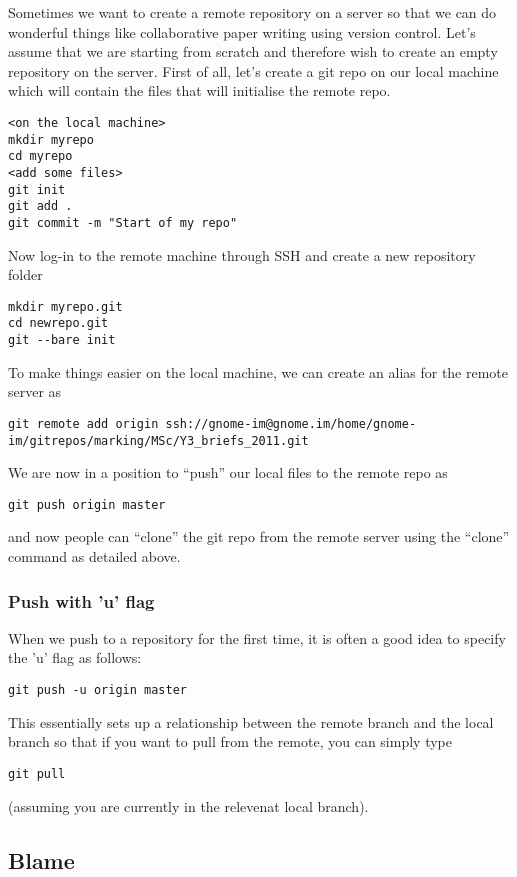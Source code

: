 \documentclass[a4paper, 10pt]{article}
\begin{document}
Sometimes we want to create a remote repository on a server so that we
can do wonderful things like collaborative paper writing using version
control. Let's assume that we are starting from scratch and therefore
wish to create an empty repository on the server. First of all, let's
create a git repo on our local machine which will contain the files
that will initialise the remote repo.
\begin{verbatim}
<on the local machine>
mkdir myrepo
cd myrepo
<add some files>
git init
git add .
git commit -m "Start of my repo"
\end{verbatim}
Now log-in to the remote machine through SSH and create a new
repository folder
\begin{verbatim}
mkdir myrepo.git
cd newrepo.git
git --bare init
\end{verbatim}

To make things easier on the local machine, we can create an alias for
the remote server as
\begin{verbatim}
git remote add origin ssh://gnome-im@gnome.im/home/gnome-im/gitrepos/marking/MSc/Y3_briefs_2011.git
\end{verbatim}

We are now in a position to ``push'' our local files to the remote
repo as
\begin{verbatim}
git push origin master
\end{verbatim}
and now people can ``clone'' the git repo from the remote server using
the ``clone'' command as detailed above.

\subsubsection*{Push with 'u' flag}
\label{sec:push}

When we push to a repository for the first time, it is often a good
idea to specify the 'u' flag as follows:
\begin{verbatim}
git push -u origin master
\end{verbatim}
This essentially sets up a relationship between the remote branch and
the local branch so that if you want to pull from the remote, you can
simply type
\begin{verbatim}
git pull
\end{verbatim}
(assuming you are currently in the relevenat local branch).

\subsection*{Blame}
\label{sec:blame}
\end{document}
